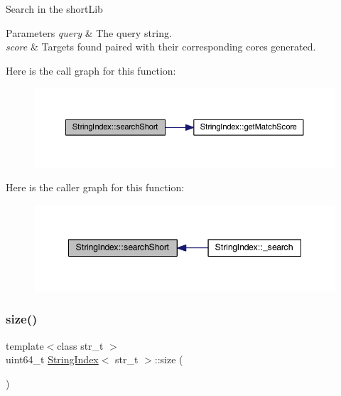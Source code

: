 Search in the short\+Lib 
\begin{DoxyParams}{Parameters}
{\em query} & The query string. \\
\hline
{\em score} & Targets found paired with their corresponding cores generated. \\
\hline
\end{DoxyParams}
Here is the call graph for this function\+:\nopagebreak
\begin{figure}[H]
\begin{center}
\leavevmode
\includegraphics[width=350pt]{class_string_index_a309f7697439fb3428de3c63dca6cdaa4_cgraph}
\end{center}
\end{figure}
Here is the caller graph for this function\+:\nopagebreak
\begin{figure}[H]
\begin{center}
\leavevmode
\includegraphics[width=348pt]{class_string_index_a309f7697439fb3428de3c63dca6cdaa4_icgraph}
\end{center}
\end{figure}
\mbox{\label{class_string_index_a95acf789f43ead39b067d1c82d3a9b02}} 
\subsubsection{\texorpdfstring{size()}{size()}}
{\footnotesize\ttfamily template$<$class str\+\_\+t $>$ \\
uint64\+\_\+t \mbox{\hyperlink{class_string_index}{String\+Index}}$<$ str\+\_\+t $>$\+::size (\begin{DoxyParamCaption}{ }\end{DoxyParamCaption})}

